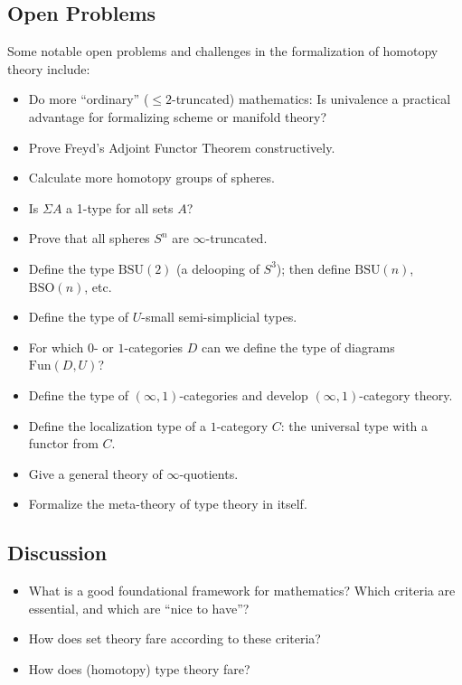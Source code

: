 \documentclass[a4paper,UKenglish,cleveref, autoref, thm-restate]{lipics-v2021}
\begin{document}
\subsection{Open Problems}

Some notable open problems and challenges in the formalization of homotopy theory include:

\begin{itemize}
\item Do more “ordinary” ($\leq 2$-truncated) mathematics: Is univalence a practical advantage for formalizing scheme or manifold theory?
\item Prove Freyd’s Adjoint Functor Theorem constructively.
\item Calculate more homotopy groups of spheres.
\item Is $\Sigma A$ a 1-type for all sets $A$?
\item Prove that all spheres $S^n$ are $\infty$-truncated.
\item Define the type $\mathrm{BSU}(2)$ (a delooping of $S^3$); then define $\mathrm{BSU}(n)$, $\mathrm{BSO}(n)$, etc.
\item Define the type of $U$-small semi-simplicial types.
\item For which $0$- or $1$-categories $D$ can we define the type of diagrams $\mathrm{Fun}(D,U)$?
\item Define the type of $(\infty,1)$-categories and develop $(\infty,1)$-category theory.
\item Define the localization type of a $1$-category $C$: the universal type with a functor from $C$.
\item Give a general theory of $\infty$-quotients.
\item Formalize the meta-theory of type theory in itself.
\end{itemize}

\subsection{Discussion}

\begin{itemize}
\item What is a good foundational framework for mathematics? Which criteria are essential, and which are “nice to have”?
\item How does set theory fare according to these criteria?
\item How does (homotopy) type theory fare?
\end{itemize}
\end{document}
